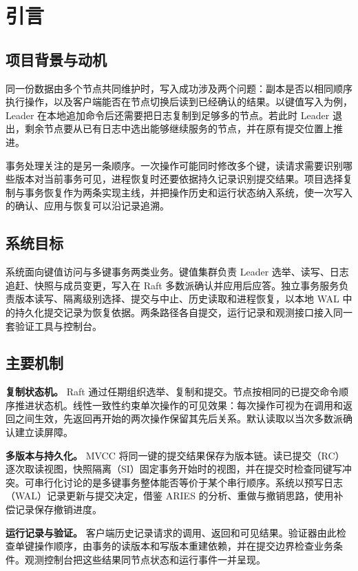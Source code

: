 \clearpage
\section{引言}

\subsection{项目背景与动机}
同一份数据由多个节点共同维护时，写入成功涉及两个问题：副本是否以相同顺序执行操作，以及客户端能否在节点切换后读到已经确认的结果。以键值写入为例，Leader 在本地追加命令后还需要把日志复制到足够多的节点。若此时 Leader 退出，剩余节点要从已有日志中选出能够继续服务的节点，并在原有提交位置上推进。

事务处理关注的是另一条顺序。一次操作可能同时修改多个键，读请求需要识别哪些版本对当前事务可见，进程恢复时还要依据持久记录识别提交结果。项目选择复制与事务恢复作为两条实现主线，并把操作历史和运行状态纳入系统，使一次写入的确认、应用与恢复可以沿记录追溯。

\subsection{系统目标}
系统面向键值访问与多键事务两类业务。键值集群负责 Leader 选举、读写、日志追赶、快照与成员变更，写入在 Raft 多数派确认并应用后应答。独立事务服务负责版本读写、隔离级别选择、提交与中止、历史读取和进程恢复，以本地 WAL 中的持久化提交记录为恢复依据。两条路径各自提交，运行记录和观测接口接入同一套验证工具与控制台。

\subsection{主要机制}
\textbf{复制状态机。} Raft 通过任期组织选举、复制和提交\cite{raft}。节点按相同的已提交命令顺序推进状态机。线性一致性约束单次操作的可见效果：每次操作可视为在调用和返回之间生效，先返回再开始的两次操作保留其先后关系\cite{linearizability}。默认读取以当次多数派确认建立读屏障。

\textbf{多版本与持久化。} MVCC 将同一键的提交结果保存为版本链。读已提交（RC）逐次取读视图，快照隔离（SI）固定事务开始时的视图，并在提交时检查同键写冲突\cite{isolation}。可串行化讨论的是多键事务整体能否等价于某个串行顺序。系统以预写日志（WAL）记录更新与提交决定，借鉴 ARIES 的分析、重做与撤销思路，使用补偿记录保存撤销进度\cite{aries}。

\textbf{运行记录与验证。} 客户端历史记录请求的调用、返回和可见结果。验证器由此检查单键操作顺序，由事务的读版本和写版本重建依赖，并在提交边界检查业务条件。观测控制台把这些结果同节点状态和运行事件一并呈现。
